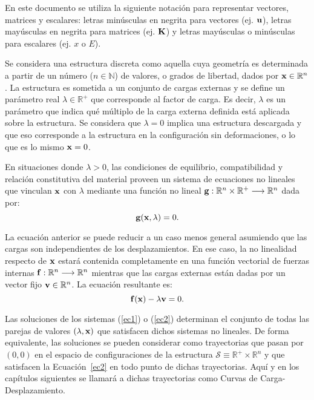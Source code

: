 En este documento se utiliza la siguiente notación para representar vectores, matrices y escalares: letras minúsculas en negrita para vectores (ej. ${\bf u}$), letras mayúsculas en negrita para matrices (ej. ${\bf K}$) y letras mayúsculas o minúsculas para escalares (ej. $x$ o $E$).

Se considera una estructura discreta como aquella cuya geometría es determinada a partir de un número ($n\in\mathbb{N}$) de valores, o grados de libertad, dados por ${\bf x}\in \mathbb{R}^n$. %
%
La estructura es sometida a un conjunto de cargas externas y se define un parámetro real $\lambda\in \mathbb{R}^+$ que corresponde al factor de carga. %
%
Es decir, $\lambda$ es un parámetro que indica qué múltiplo de la carga externa definida está aplicada sobre la estructura. %
%
Se considera que $\lambda=0$ implica una estructura descargada y que eso corresponde a la estructura en la configuración sin deformaciones, o lo que es lo mismo ${\bf x}=0$.


En situaciones donde $\lambda>0$, las condiciones de equilibrio, compatibilidad y relación constitutiva del material proveen un sistema de ecuaciones no lineales que vinculan ${\bf x}$ con $\lambda$ mediante una función no lineal ${\bf g}:\mathbb{R}^n \times \mathbb{R}^+ \longrightarrow \mathbb{R}^n$ dada por:
%
\begin{equation}\label{ec1}
{\bf g}({\bf x},\lambda)=0.
\end{equation}

La ecuación anterior se puede reducir a un caso menos general asumiendo que las cargas son independientes de los desplazamientos. En ese caso, la no linealidad respecto de ${\bf x}$ estará contenida completamente en una función vectorial de fuerzas internas ${\bf f}:\mathbb{R}^n \longrightarrow \mathbb{R}^n$ mientras que las cargas externas están dadas por un vector fijo ${\bf v} \in \mathbb{R}^n$. %
%
La ecuación resultante es:
%
\begin{equation}\label{ec2}
{\bf f}({\bf x})-\lambda {\bf v}=0.
\end{equation}

Las soluciones de los sistemas (\ref{ec1}) o (\ref{ec2}) determinan el conjunto de todas las parejas de valores $(\lambda,{\bf x})$ que satisfacen dichos sistemas no lineales. De forma equivalente, las soluciones se pueden considerar como trayectorias que pasan por $(0,0)$ en el espacio de configuraciones de la estructura $\mathcal{S} \equiv \mathbb{R}^+ \times \mathbb{R}^n$ y que satisfacen la Ecuación~\eqref{ec2} en todo punto de dichas trayectorias. Aquí y en los capítulos siguientes se llamará a dichas trayectorias como Curvas de Carga-Desplazamiento.


